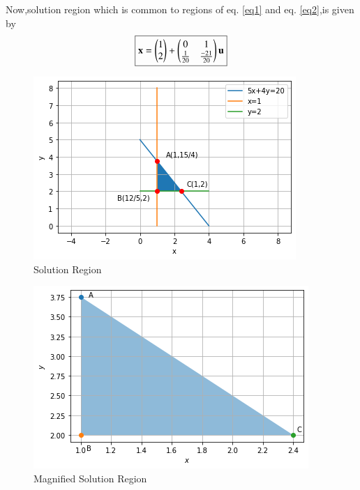 \documentclass[journal,12pt,twocolumn]{IEEEtran}
\begin{document}
Now,solution region which is common to regions of eq. \eqref{eq1} and eq. \eqref{eq2},is given by
\begin{align}
    \boxed{\mathbf{x} = \begin{pmatrix}1 \\ 2\end{pmatrix}+\begin{pmatrix}0 & 1\\ \frac{1}{20} & \frac{-21}{20}\end{pmatrix}\mathbf{u}}
\end{align}
\begin{figure}[!ht]
\centering
\includegraphics[width=\columnwidth]{SOLUTION.png}
\caption{Solution Region}
\label{fig:fig1}	
\end{figure}
\begin{figure}[!ht]
\centering
\includegraphics[width=\columnwidth]{img2.png}
\caption{Magnified Solution Region}
\label{fig:fig2}	
\end{figure}
\end{document}
